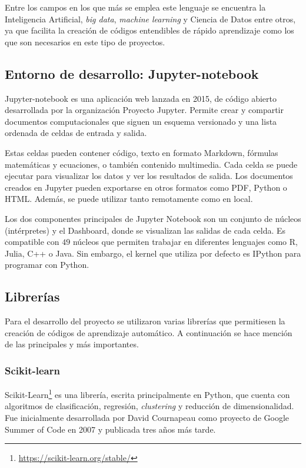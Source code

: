 \documentclass[a4paper, 12pt]{book}
\begin{document}
Entre los campos en los que más se emplea este lenguaje se encuentra la Inteligencia Artificial, \textit{big data}, \textit{machine learning} y Ciencia de Datos entre otros, ya que facilita la creación de códigos entendibles de rápido aprendizaje como los que son necesarios en este tipo de proyectos.

\subsection{Entorno de desarrollo: Jupyter-notebook}
\label{subsec:entorno_de_desarrollo}

Jupyter-notebook es una aplicación web lanzada en 2015, de código abierto desarrollada por la organización Proyecto Jupyter. Permite crear y compartir documentos computacionales que siguen un esquema versionado y una lista ordenada de celdas de entrada y salida.

Estas celdas pueden contener código, texto en formato Markdown, fórmulas matemáticas y ecuaciones, o también contenido multimedia. Cada celda se puede ejecutar para visualizar los datos y ver los resultados de salida. Los documentos creados en Jupyter pueden exportarse en otros formatos como PDF, Python o HTML. Además, se puede utilizar tanto remotamente como en local.

Los dos componentes principales de Jupyter Notebook son un conjunto de núcleos (intérpretes) y el Dashboard, donde se visualizan las salidas de cada celda. Es compatible con $49$ núcleos que permiten trabajar en diferentes lenguajes como R, Julia, C++ o Java. Sin embargo, el kernel que utiliza por defecto es IPython para programar con Python. 

\subsection{Librerías}
\label{subsec:Librerías}
Para el desarrollo del proyecto se utilizaron varias librerías que permitiesen la creación de códigos de aprendizaje automático. A continuación se hace mención de las principales y más importantes.

\subsubsection{Scikit-learn}
\label{subsubsec:Scikit-learn}
Scikit-Learn\footnote{\url{https://scikit-learn.org/stable/}} es una librería, escrita principalmente en Python, que cuenta con algoritmos de clasificación, regresión, \textit{clustering} y reducción de dimensionalidad. Fue inicialmente desarrollada por David Cournapeau como proyecto de Google Summer of Code en 2007 y publicada tres años más tarde.
\end{document}

